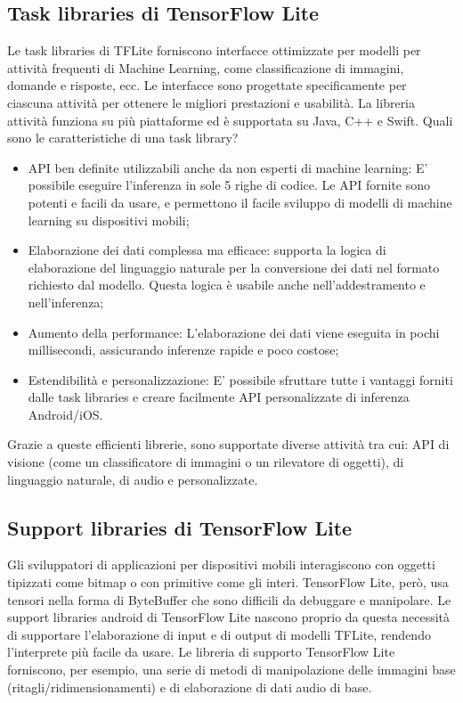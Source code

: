 \subsection{Task libraries di TensorFlow Lite}
Le task libraries di TFLite forniscono interfacce ottimizzate per modelli per attività frequenti di Machine Learning, come classificazione di immagini,
domande e risposte, ecc. Le interfacce sono progettate specificamente per ciascuna attività per ottenere le migliori prestazioni e usabilità. La libreria
attività funziona su più piattaforme ed è supportata su Java, C++ e Swift.
Quali sono le caratteristiche di una task library?
\begin{itemize}
    \item API ben definite utilizzabili anche da non esperti di machine learning: E’ possibile eseguire l’inferenza in sole 5 righe di codice. Le API
    fornite sono potenti e facili da usare, e permettono il facile sviluppo di modelli di machine learning su dispositivi mobili;
    \item Elaborazione dei dati complessa ma efficace: supporta la logica di elaborazione del linguaggio naturale per la conversione dei dati nel
    formato richiesto dal modello. Questa logica è usabile anche nell’addestramento e nell’inferenza;
    \item Aumento della performance: L’elaborazione dei dati viene eseguita in pochi millisecondi, assicurando inferenze rapide e poco costose;
    \item Estendibilità e personalizzazione: E’ possibile sfruttare tutte i vantaggi forniti dalle task libraries e creare facilmente API personalizzate
    di inferenza Android/iOS.
\end{itemize}

Grazie a queste efficienti librerie, sono supportate diverse attività tra cui: API di visione (come un classificatore di immagini o un rilevatore di
oggetti), di linguaggio naturale, di audio e personalizzate.

\subsection{Support libraries di TensorFlow Lite}
Gli sviluppatori di applicazioni per dispositivi mobili interagiscono con oggetti tipizzati come bitmap o con primitive come gli interi. TensorFlow Lite,
però, usa tensori nella forma di ByteBuffer che sono difficili da debuggare e manipolare. Le support libraries android di TensorFlow Lite nascono proprio
da questa necessità di supportare l’elaborazione di input e di output di modelli TFLite, rendendo l’interprete più facile da usare.
Le libreria di supporto TensorFlow Lite forniscono, per esempio, una serie di metodi di manipolazione delle immagini base (ritagli/ridimensionamenti) e
di elaborazione di dati audio di base.

